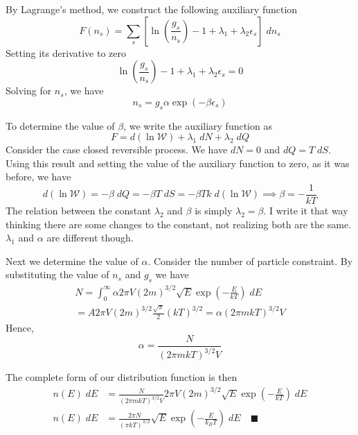 \documentclass[../../../Main.tex]{subfiles}
\begin{document}
By Lagrange's method, we construct the following auxiliary function
\begin{equation*}
    F(n_s)=\sum_s\left[\ln \left(\frac{g_s}{n_s}\right)-1+\lambda_1 +\lambda_2\epsilon_s\right]\;dn_s
\end{equation*}
Setting its derivative to zero
\begin{equation*}
    \ln \left(\frac{g_s}{n_s}\right)-1+\lambda_1 +\lambda_2\epsilon_s=0
\end{equation*}
Solving for $n_s$, we have 
\begin{equation*}
    n_s=g_s\alpha\exp (-\beta \epsilon_s)
\end{equation*}

To determine the value of $\beta$, we write the auxiliary function as 
\begin{equation*}
    F=d(\ln \mathcal{W})+\lambda_1\;dN+\lambda_2 \;dQ
\end{equation*}
Consider the case closed reversible process. We have $dN=0$ and $dQ=T\;dS$. Using this result and setting the value of the auxiliary function to zero, as it was before, we have
\begin{equation*}
    d(\ln \mathcal{W})=-\beta \;dQ=-\beta T\;dS=-\beta Tk\;d(\ln \mathcal{W})\implies\beta=-\frac{1}{kT}
\end{equation*}
The relation between the constant $\lambda_2$ and $\beta$ is simply $\lambda_2=\beta$. I write it that way thinking there are some changes to the constant, not realizing both are the same. $\lambda_1$ and $\alpha$ are different though.

Next we determine the value of $\alpha$. Consider the number of particle constraint. By substituting the value of $n_s$ and $g_s$ we have
\begin{multline*}
    N=\int_0^{\infty}\alpha2\pi V(2m)^{3/2}\sqrt{E}\exp \left(-\frac{E}{kT}\right)\;dE\\
    =A2\pi V(2m)^{3/2}\frac{\sqrt{\pi}}{2}(kT)^{3/2}= \alpha\left(2\pi m kT\right)^{3/2}V
\end{multline*}
Hence,
\begin{equation*}
    \alpha=\frac{N}{\left(2\pi m kT\right)^{3/2}V}
\end{equation*}

The complete form of our distribution function is then
\begin{align*}
    n(E)\;dE&=\frac{N}{\left(2\pi m kT\right)^{3/2}V} 2\pi V(2m)^{3/2}\sqrt{E}\exp \left(-\frac{E}{kT}\right)\;dE\\
    n(E)\;dE&=\frac{2\pi N}{(\pi kT)^{3/2}}\sqrt{E}\exp\left(-\frac{E}{k_BT}\right)\;dE\quad\blacksquare
\end{align*}
\end{document}
